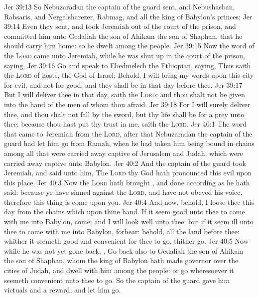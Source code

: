 \vs Jer 39:13 So Nebuzaradan the captain of the guard sent, and Nebushasban, Rabsaris, and Nergalsharezer, Rabmag, and all the king of Babylon's princes;
\vs Jer 39:14 Even they sent, and took Jeremiah out of the court of the prison, and committed him unto Gedaliah the son of Ahikam the son of Shaphan, that he should carry him home: so he dwelt among the people.
\vs Jer 39:15 Now the word of the \textsc{Lord} came unto Jeremiah, while he was shut up in the court of the prison, saying,
\vs Jer 39:16 Go and speak to Ebedmelech the Ethiopian, saying, Thus saith the \textsc{Lord} of hosts, the God of Israel; Behold, I will bring my words upon this city for evil, and not for good; and they shall be  in that day before thee.
\vs Jer 39:17 But I will deliver thee in that day, saith the \textsc{Lord}: and thou shalt not be given into the hand of the men of whom thou  afraid.
\vs Jer 39:18 For I will surely deliver thee, and thou shalt not fall by the sword, but thy life shall be for a prey unto thee: because thou hast put thy trust in me, saith the \textsc{Lord}.
\vs Jer 40:1 The word that came to Jeremiah from the \textsc{Lord}, after that Nebuzaradan the captain of the guard had let him go from Ramah, when he had taken him being bound in chains among all that were carried away captive of Jerusalem and Judah, which were carried away captive unto Babylon.
\vs Jer 40:2 And the captain of the guard took Jeremiah, and said unto him, The \textsc{Lord} thy God hath pronounced this evil upon this place.
\vs Jer 40:3 Now the \textsc{Lord} hath brought , and done according as he hath said: because ye have sinned against the \textsc{Lord}, and have not obeyed his voice, therefore this thing is come upon you.
\vs Jer 40:4 And now, behold, I loose thee this day from the chains which  upon thine hand. If it seem good unto thee to come with me into Babylon, come; and I will look well unto thee: but if it seem ill unto thee to come with me into Babylon, forbear: behold, all the land  before thee: whither it seemeth good and convenient for thee to go, thither go.
\vs Jer 40:5 Now while he was not yet gone back, , Go back also to Gedaliah the son of Ahikam the son of Shaphan, whom the king of Babylon hath made governor over the cities of Judah, and dwell with him among the people: or go wheresoever it seemeth convenient unto thee to go. So the captain of the guard gave him victuals and a reward, and let him go.
